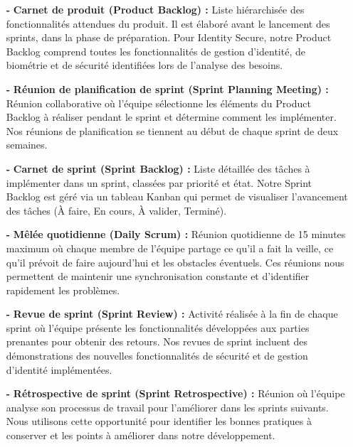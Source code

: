 \begin{itemize}
  \item[\textbf{-}] \textbf{Carnet de produit (Product Backlog) :} Liste hiérarchisée des fonctionnalités attendues du produit. Il est élaboré avant le lancement des sprints, dans la phase de préparation. Pour Identity Secure, notre Product Backlog comprend toutes les fonctionnalités de gestion d'identité, de biométrie et de sécurité identifiées lors de l'analyse des besoins.

  \item[\textbf{-}] \textbf{Réunion de planification de sprint (Sprint Planning Meeting) :} Réunion collaborative où l'équipe sélectionne les éléments du Product Backlog à réaliser pendant le sprint et détermine comment les implémenter. Nos réunions de planification se tiennent au début de chaque sprint de deux semaines.

  \item[\textbf{-}] \textbf{Carnet de sprint (Sprint Backlog) :} Liste détaillée des tâches à implémenter dans un sprint, classées par priorité et état. Notre Sprint Backlog est géré via un tableau Kanban qui permet de visualiser l'avancement des tâches (À faire, En cours, À valider, Terminé).

  \item[\textbf{-}] \textbf{Mêlée quotidienne (Daily Scrum) :} Réunion quotidienne de 15 minutes maximum où chaque membre de l'équipe partage ce qu'il a fait la veille, ce qu'il prévoit de faire aujourd'hui et les obstacles éventuels. Ces réunions nous permettent de maintenir une synchronisation constante et d'identifier rapidement les problèmes.

  \item[\textbf{-}] \textbf{Revue de sprint (Sprint Review) :} Activité réalisée à la fin de chaque sprint où l'équipe présente les fonctionnalités développées aux parties prenantes pour obtenir des retours. Nos revues de sprint incluent des démonstrations des nouvelles fonctionnalités de sécurité et de gestion d'identité implémentées.

  \item[\textbf{-}] \textbf{Rétrospective de sprint (Sprint Retrospective) :} Réunion où l'équipe analyse son processus de travail pour l'améliorer dans les sprints suivants. Nous utilisons cette opportunité pour identifier les bonnes pratiques à conserver et les points à améliorer dans notre développement.
\end{itemize}


